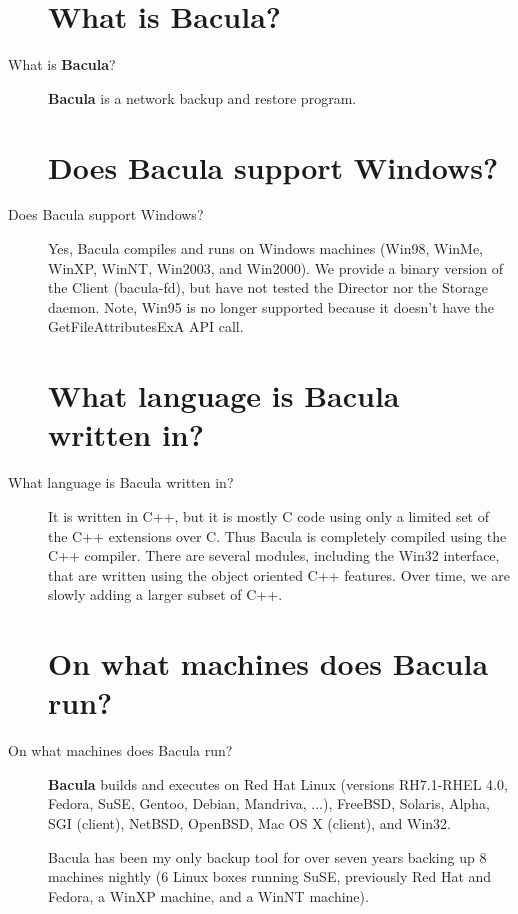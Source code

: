 \begin{description}
\label{what}
\section{What is Bacula?}
\item [What is {\bf Bacula}? ]
   {\bf Bacula} is a network backup and restore program. 

\section{Does Bacula support Windows?}
\item [Does Bacula support Windows?]
   Yes, Bacula compiles and runs on Windows machines (Win98, WinMe, WinXP,
   WinNT, Win2003, and Win2000).  We provide a binary version of the Client
   (bacula-fd), but have not tested the Director nor the Storage daemon.
   Note, Win95 is no longer supported because it doesn't have the
   GetFileAttributesExA API call.
 

\label{lang}
\section{What language is Bacula written in?}
\item [What language is Bacula written in?]
   It is written in C++, but it is mostly C  code using only a limited set of
   the C++ extensions  over C.  Thus Bacula is completely  compiled using the
   C++ compiler. There are several modules, including the Win32 interface, that
   are written using the  object oriented C++ features. Over time, we are slowly
   adding a larger  subset of C++.  

\label{run}
\section{On what machines does Bacula run?}
\item [On what machines does Bacula run? ]
   {\bf Bacula} builds and executes on Red Hat Linux (versions RH7.1-RHEL
   4.0, Fedora, SuSE, Gentoo, Debian, Mandriva, ...), FreeBSD, Solaris,
   Alpha, SGI (client), NetBSD, OpenBSD, Mac OS X (client), and Win32.

   Bacula has been my only backup tool for over seven years backing up 8
   machines nightly (6 Linux boxes running SuSE, previously
   Red Hat and Fedora, a WinXP machine, and a WinNT machine).
 


\end{description}
